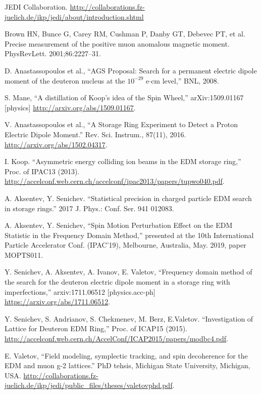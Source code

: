 \documentclass[]{elsarticle}
\begin{document}
\begin{thebibliography}{9}

  JEDI Collaboration. \url{http://collaborations.fz-juelich.de/ikp/jedi/about/introduction.shtml}

  Brown HN, Bunce G, Carey RM, Cushman P, Danby GT, Debevec PT, et al.
  Precise measurement of the positive muon anomalous magnetic moment. PhysRevLett. 2001;86:2227–31. 

  
  D. Anastassopoulos et al., ``AGS Proposal: Search for a permanent electric dipole moment of
  the deuteron nucleus at the $10^{-29}$ e$\cdot$cm level,'' BNL, 2008.

  S. Mane, ``A distillation of Koop's idea of the Spin Wheel,'' arXiv:1509.01167 [physics]
  \url{http://arxiv.org/abs/1509.01167}.

  V. Anastassopoulos et al., ``A Storage Ring Experiment to Detect a Proton Electric Dipole Moment.''
  Rev. Sci. Instrum., 87(11), 2016.
  \url{http://arxiv.org/abs/1502.04317}.

  I. Koop. ``Asymmetric energy colliding ion beams in the EDM storage ring,'' Proc. of IPAC13 (2013).
  \url{http://accelconf.web.cern.ch/accelconf/ipac2013/papers/tupwo040.pdf}.

  A. Aksentev, Y. Senichev. ``Statistical precision in charged particle EDM search in storage rings.''
  2017 J. Phys.: Conf. Ser. 941 012083.

  A. Aksentev, Y. Senichev, ``Spin Motion Perturbation Effect on the EDM Statistic
  in the Frequency Domain Method,'' presented at the 10th International Particle Accelerator Conf. (IPAC'19),
  Melbourne, Australia, May. 2019, paper MOPTS011.

  Y. Senichev, A. Aksentev, A. Ivanov, E. Valetov, ``Frequency domain method of the search for
  the deuteron electric dipole moment in a storage ring with imperfections,'' arxiv:1711.06512 [physics.acc-ph]
  \url{https://arxiv.org/abs/1711.06512}.

  Y. Senichev, S. Andrianov, S. Chekmenev, M. Berz, E.Valetov. ``Investigation of Lattice for Deuteron EDM Ring,''
  Proc. of ICAP15 (2015). \url{http://accelconf.web.cern.ch/AccelConf/ICAP2015/papers/modbc4.pdf}.

  E. Valetov, ``Field modeling, symplectic tracking, and spin decoherence for the EDM and muon g-2 lattices.''
  PhD tehsis, Michigan State University, Michigan, USA.
  \url{http://collaborations.fz-juelich.de/ikp/jedi/public_files/theses/valetovphd.pdf}.


\end{thebibliography}
\end{document}
